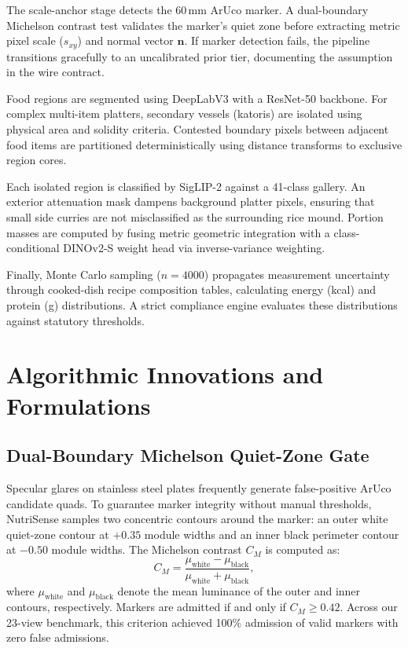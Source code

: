 \documentclass[conference]{IEEEtran}
\begin{document}
The scale-anchor stage detects the 60\,mm ArUco marker. A dual-boundary Michelson contrast test validates the marker's quiet zone before extracting metric pixel scale ($s_{xy}$) and normal vector $\mathbf{n}$. If marker detection fails, the pipeline transitions gracefully to an uncalibrated prior tier, documenting the assumption in the wire contract.

Food regions are segmented using DeepLabV3 with a ResNet-50 backbone. For complex multi-item platters, secondary vessels (katoris) are isolated using physical area and solidity criteria. Contested boundary pixels between adjacent food items are partitioned deterministically using distance transforms to exclusive region cores.

Each isolated region is classified by SigLIP-2 against a 41-class gallery. An exterior attenuation mask dampens background platter pixels, ensuring that small side curries are not misclassified as the surrounding rice mound. Portion masses are computed by fusing metric geometric integration with a class-conditional DINOv2-S weight head via inverse-variance weighting.

Finally, Monte Carlo sampling ($n=4000$) propagates measurement uncertainty through cooked-dish recipe composition tables, calculating energy (kcal) and protein (g) distributions. A strict compliance engine evaluates these distributions against statutory thresholds.

\section{Algorithmic Innovations and Formulations}

\subsection{Dual-Boundary Michelson Quiet-Zone Gate}
Specular glares on stainless steel plates frequently generate false-positive ArUco candidate quads. To guarantee marker integrity without manual thresholds, NutriSense samples two concentric contours around the marker: an outer white quiet-zone contour at $+0.35$ module widths and an inner black perimeter contour at $-0.50$ module widths. The Michelson contrast $C_M$ is computed as:
\begin{equation}
C_M = \frac{\mu_{\mathrm{white}} - \mu_{\mathrm{black}}}{\mu_{\mathrm{white}} + \mu_{\mathrm{black}}},
\end{equation}
where $\mu_{\mathrm{white}}$ and $\mu_{\mathrm{black}}$ denote the mean luminance of the outer and inner contours, respectively. Markers are admitted if and only if $C_M \ge 0.42$. Across our 23-view benchmark, this criterion achieved 100\% admission of valid markers with zero false admissions.
\end{document}
